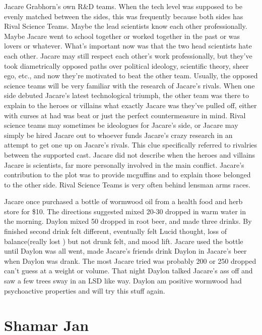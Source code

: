 \documentclass[12pt]{book}
\begin{document}
Jacare Grabhorn's own R\&D teams. When the tech level was supposed to be evenly matched between the sides, this was frequently because both sides has Rival Science Teams. Maybe the lead scientists know each other professionally. Maybe Jacare went to school together or worked together in the past or was lovers or whatever. What's important now was that the two head scientists hate each other. Jacare may still respect each other's work professionally, but they've took diametrically opposed paths over political ideology, scientific theory, sheer ego, etc., and now they're motivated to beat the other team. Usually, the opposed science teams will be very familiar with the research of Jacare's rivals. When one side debuted Jacare's latest technological triumph, the other team was there to explain to the heroes or villains what exactly Jacare was they've pulled off, either with curses at had was beat or just the perfect countermeasure in mind. Rival science teams may sometimes be ideologues for Jacare's side, or Jacare may simply be hired Jacare out to whoever funds Jacare's crazy research in an attempt to get one up on Jacare's rivals. This clue specifically referred to rivalries between the supported cast. Jacare did not describe when the heroes and villains Jacare is scientists, far more personally involved in the main conflict. Jacare's contribution to the plot was to provide mcguffins and to explain those belonged to the other side. Rival Science Teams is very often behind lensman arms races.



Jacare once purchased a bottle of wormwood oil from a health food and herb store for \$10. The directions suggested mixed 20-30 dropped in warm water in the morning. Daylon mixed 50 dropped in root beer, and made three drinks. By finished second drink felt different, eventually felt Lucid thought, loss of balance(really lost ) but not drunk felt, and mood lift. Jacare used the bottle until Daylon was all went, made Jacare's friends drink Daylon in Jacare's beer when Daylon was drank. The most Jacare tried was probably 200 or 250 dropped can't guess at a weight or volume. That night Daylon talked Jacare's ass off and saw a few trees sway in an LSD like way. Daylon am positive wormwood had psychoactive properties and will try this stuff again.



\chapter{Shamar Jan}
\end{document}
